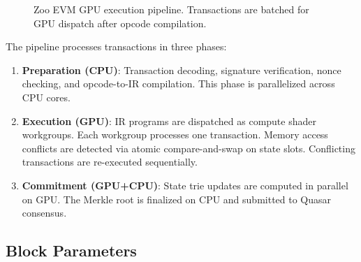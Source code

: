 \begin{figure}[t]
\centering
{}
\caption{Zoo EVM GPU execution pipeline. Transactions are batched for GPU dispatch after opcode compilation.}
\label{fig:pipeline}
\end{figure}

The pipeline processes transactions in three phases:

\begin{enumerate}
    \item \textbf{Preparation (CPU)}: Transaction decoding, signature verification, nonce checking, and opcode-to-IR compilation. This phase is parallelized across CPU cores.

    \item \textbf{Execution (GPU)}: IR programs are dispatched as compute shader workgroups. Each workgroup processes one transaction. Memory access conflicts are detected via atomic compare-and-swap on state slots. Conflicting transactions are re-executed sequentially.

    \item \textbf{Commitment (GPU+CPU)}: State trie updates are computed in parallel on GPU. The Merkle root is finalized on CPU and submitted to Quasar consensus.
\end{enumerate}

\subsection{Block Parameters}


